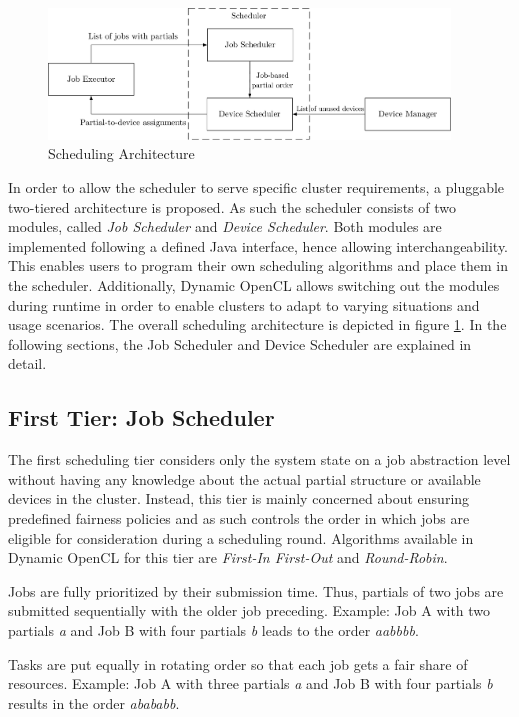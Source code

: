 \begin{figure}[!htb]
	\includegraphics[width=0.95\textwidth]{drawings/scheduling_arch.pdf}
	\centering
	\caption{Scheduling Architecture}
	\label{img:scheduling_arch}
\end{figure}

In order to allow the scheduler to serve specific cluster requirements, a pluggable two-tiered architecture is proposed. As such the scheduler consists of two modules, called \textit{Job Scheduler} and \textit{Device Scheduler}. Both modules are implemented following a defined Java interface, hence allowing interchangeability. This enables users to program their own scheduling algorithms and place them in the scheduler. Additionally, Dynamic OpenCL allows switching out the modules during runtime in order to enable clusters to adapt to varying situations and usage scenarios. The overall scheduling architecture is depicted in figure \ref{img:scheduling_arch}. In the following sections, the Job Scheduler and Device Scheduler are explained in detail.

\subsection{First Tier: Job Scheduler}
The first scheduling tier considers only the system state on a job abstraction level without having any knowledge about the actual partial structure or available devices in the cluster. Instead, this tier is mainly concerned about ensuring predefined fairness policies and as such controls the order in which jobs are eligible for consideration during a scheduling round. Algorithms available in Dynamic OpenCL for this tier are \textit{First-In First-Out} and \textit{Round-Robin}.

\begin{description}[style=nextline]
	\item[First-In First-Out]
	Jobs are fully prioritized by their submission time. Thus, partials of two jobs are submitted sequentially with the older job preceding. Example: Job A with two partials \textit{a} and Job B with four partials \textit{b} leads to the order \textit{aabbbb}.
	\item[Round-Robin]
	Tasks are put equally in rotating order so that each job gets a fair share of resources. Example: Job A with three partials \textit{a} and Job B with four partials \textit{b} results in the order \textit{abababb}.
\end{description}

